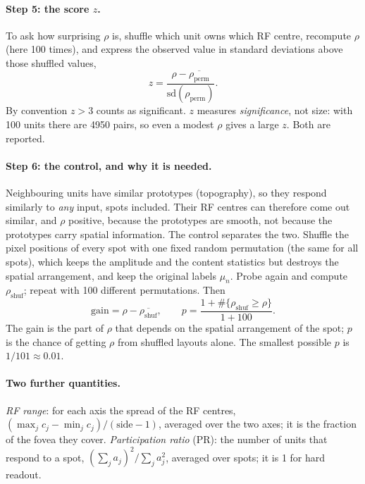 \documentclass[11pt,a4paper]{article}
\begin{document}
\paragraph{Step 5: the score $z$.} To ask how surprising $\rho$ is, shuffle which
unit owns which RF centre, recompute $\rho$ (here 100 times), and express the
observed value in standard deviations above those shuffled values,
\begin{equation}
  z=\frac{\rho-\overline{\rho_{\mathrm{perm}}}}{\mathrm{sd}(\rho_{\mathrm{perm}})} .
\end{equation}
By convention $z>3$ counts as significant. $z$ measures \emph{significance}, not
size: with 100 units there are 4950 pairs, so even a modest $\rho$ gives a large $z$.
Both are reported.

\paragraph{Step 6: the control, and why it is needed.} Neighbouring units have
similar prototypes (topography), so they respond similarly to \emph{any} input,
spots included. Their RF centres can therefore come out similar, and $\rho$ positive,
because the prototypes are smooth, not because the prototypes carry spatial
information. The control separates the two. Shuffle the pixel positions of every
spot with one fixed random permutation (the same for all spots), which keeps the
amplitude and the content statistics but destroys the spatial arrangement, and keep
the original labels $\mu_n$. Probe again and compute $\rho_{\mathrm{shuf}}$; repeat
with 100 different permutations. Then
\begin{equation}
  \mathrm{gain}=\rho-\overline{\rho_{\mathrm{shuf}}},\qquad
  p=\frac{1+\#\{\rho_{\mathrm{shuf}}\ge\rho\}}{1+100}.
\end{equation}
The gain is the part of $\rho$ that depends on the spatial arrangement of the
spot; $p$ is the chance of getting $\rho$ from shuffled layouts alone. The smallest
possible $p$ is $1/101\approx0.01$.

\paragraph{Two further quantities.} \emph{RF range}: for each axis the spread of the
RF centres, $(\max_j c_j-\min_j c_j)/(\text{side}-1)$, averaged over the two axes; it
is the fraction of the fovea they cover. \emph{Participation ratio} (PR): the
number of units that respond to a spot, $(\sum_j a_j)^2/\sum_j a_j^2$, averaged over
spots; it is 1 for hard readout.
\end{document}

